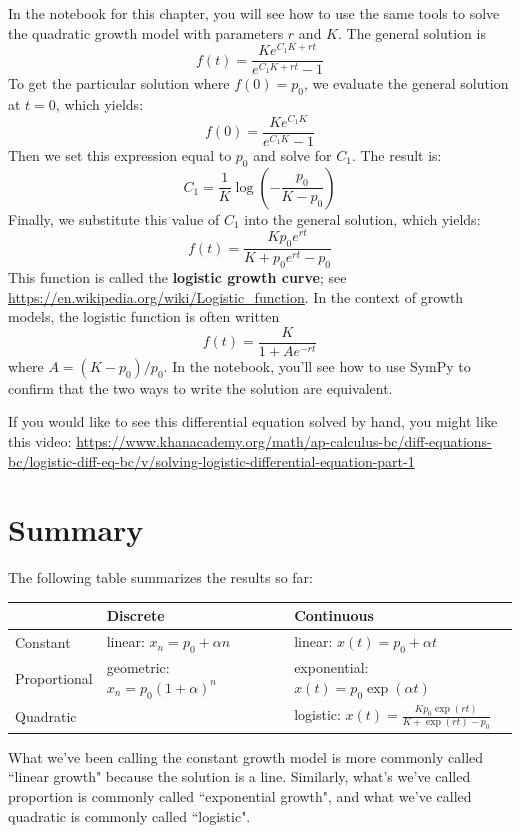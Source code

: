 \documentclass[12pt]{book}
\theoremstyle{exercise}
\begin{document}
In the notebook for this chapter, you will see how to use the same tools to solve the quadratic growth model with parameters $r$ and $K$.  The general solution is
%
\[ f{\left (t \right )} = \frac{K e^{C_{1} K + r t}}{e^{C_{1} K + r t} - 1} \]
%
To get the particular solution where $f(0) = p_0$, we evaluate the general solution at $t=0$, which yields:
%
\[ f(0) = \frac{K e^{C_{1} K}}{e^{C_{1} K} - 1} \]
%
Then we set this expression equal to $p_0$ and solve for $C_1$.  The result is:
%
\[ C_1 = \frac{1}{K} \log{\left (- \frac{p_{0}}{K - p_{0}} \right )} \]
%
Finally, we substitute this value of $C_1$ into the general solution, which yields:
%
\[ f(t) = \frac{K p_{0} e^{r t}}{K + p_{0} e^{r t} - p_{0}} \]
%
This function is called the {\bf logistic growth curve}; see \url{https://en.wikipedia.org/wiki/Logistic_function}.  In the context of growth models, the logistic function is often written
%
\[ f(t) = \frac{K}{1 + A e^{-rt}} \]
%
where $A = (K - p_0) / p_0$.  In the notebook, you'll see how to use SymPy to confirm that the two ways to write the solution are equivalent.

If you would like to see this differential equation solved by hand, you might like this video: \url{https://www.khanacademy.org/math/ap-calculus-bc/diff-equations-bc/logistic-diff-eq-bc/v/solving-logistic-differential-equation-part-1}


\section{Summary}

The following table summarizes the results so far:

\begin{tabular}{l|l|l} 
         & Discrete & Continuous \\ 
\hline 
Constant & linear: $x_n = p_0 + \alpha n$ & linear: $x(t) = p_0 + \alpha t$ \\ 
 
Proportional & geometric: $x_n = p_0(1+\alpha)^n$ & exponential: $x(t) = p_0 \exp(\alpha t)$ \\ 
 
Quadratic &  & logistic: $x(t) = \frac{K p_0 \exp(rt)}{K + \exp(rt) - p_0}$ \\ 
\end{tabular} 

What we've been calling the constant growth model is more commonly called ``linear growth" because the solution is a line.  Similarly, what's we've called proportion is commonly called ``exponential growth", and what we've called quadratic is commonly called ``logistic".
\end{document}
